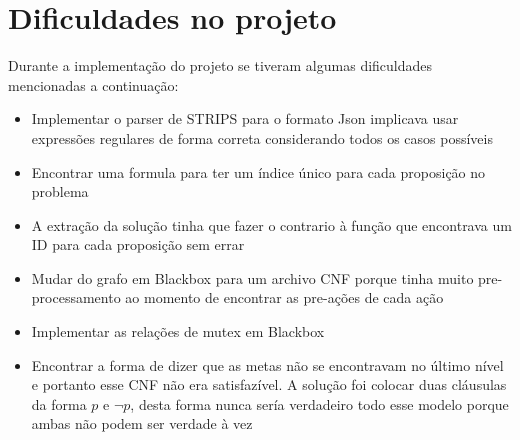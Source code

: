 \section{Dificuldades no projeto}
Durante a implementação do projeto se tiveram algumas dificuldades mencionadas a continuação:
\begin{itemize}
	\item Implementar o parser de STRIPS para o formato Json implicava usar expressões regulares de forma correta considerando todos os casos possíveis
	\item Encontrar uma formula para ter um índice único para cada proposição no problema
	\item A extração da solução tinha que fazer o contrario à função que encontrava um ID para cada proposição sem errar
	\item Mudar do grafo em Blackbox para um archivo CNF porque tinha muito pre-processamento ao momento de encontrar as pre-ações de cada ação
	\item Implementar as relações de mutex em Blackbox
	\item Encontrar a forma de dizer que as metas não se encontravam no último nível e portanto esse CNF não era satisfazível. A solução foi colocar duas cláusulas da forma $p$ e $\lnot p$, desta forma nunca sería verdadeiro todo esse modelo porque ambas não podem ser verdade à vez
\end{itemize}